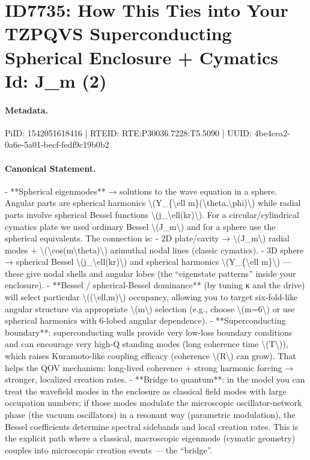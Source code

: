 \section*{ID7735: How This Ties into Your TZPQVS Superconducting Spherical Enclosure + Cymatics Id: J\_m (2)}
\paragraph{Metadata.}
PiID: 1542051618416 | RTEID: RTE:P30036.7228:T5.5090 | UUID: 4be4cea2-0a6e-5a01-becf-fedf9c19b0b2

\paragraph{Canonical Statement.}
- **Spherical eigenmodes** → solutions to the wave equation in a sphere. Angular parts are spherical harmonics \textbackslash{}(Y\_\{\textbackslash{}ell m\}(\textbackslash{}theta,\textbackslash{}phi)\textbackslash{}) while radial parts involve spherical Bessel functions \textbackslash{}(j\_\textbackslash{}ell(kr)\textbackslash{}). For a circular/cylindrical cymatics plate we used ordinary Bessel \textbackslash{}(J\_m\textbackslash{}) and for a sphere use the spherical equivalents. The connection is: - 2D plate/cavity → \textbackslash{}(J\_m\textbackslash{}) radial modes + \textbackslash{}(\textbackslash{}cos(m\textbackslash{}theta)\textbackslash{}) azimuthal nodal lines (classic cymatics). - 3D sphere → spherical Bessel \textbackslash{}(j\_\textbackslash{}ell(kr)\textbackslash{}) and spherical harmonics \textbackslash{}(Y\_\{\textbackslash{}ell m\}\textbackslash{}) — these give nodal shells and angular lobes (the “eigenstate patterns” inside your enclosure). - **Bessel / spherical-Bessel dominance** (by tuning κ and the drive) will select particular \textbackslash{}((\textbackslash{}ell,m)\textbackslash{}) occupancy, allowing you to target six-fold-like angular structure via appropriate \textbackslash{}(m\textbackslash{}) selection (e.g., choose \textbackslash{}(m=6\textbackslash{}) or use spherical harmonics with 6-lobed angular dependence). - **Superconducting boundary**: superconducting walls provide very low-loss boundary conditions and can encourage very high-Q standing modes (long coherence time \textbackslash{}(T\textbackslash{})), which raises Kuramoto-like coupling efficacy (coherence \textbackslash{}(R\textbackslash{}) can grow). That helps the QOV mechanism: long-lived coherence + strong harmonic forcing → stronger, localized creation rates. - **Bridge to quantum**: in the model you can treat the wavefield modes in the enclosure as classical field modes with large occupation numbers; if those modes modulate the microscopic oscillator-network phase (the vacuum oscillators) in a resonant way (parametric modulation), the Bessel coefficients determine spectral sidebands and local creation rates. This is the explicit path where a classical, macroscopic eigenmode (cymatic geometry) couples into microscopic creation events — the “bridge”.

